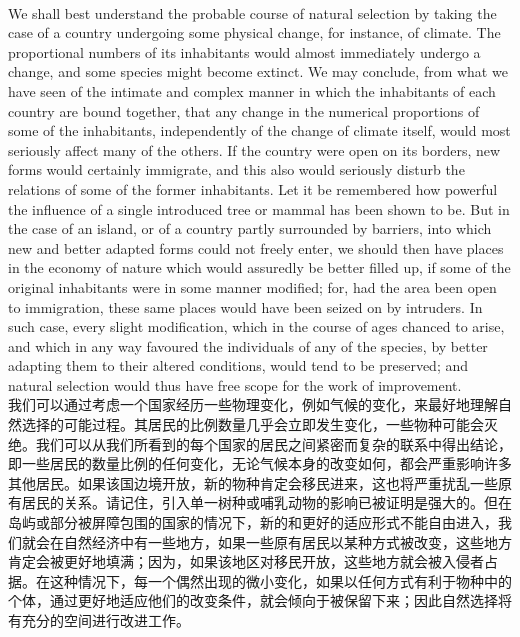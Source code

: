 \documentclass{article}
\begin{document}
\\
We shall best understand the probable course of natural selection by taking the case of a country undergoing some physical change, for instance, of climate. The proportional numbers of its inhabitants would almost immediately undergo a change, and some species might become extinct. We may conclude, from what we have seen of the intimate and complex manner in which the inhabitants of each country are bound together, that any change in the numerical proportions of some of the inhabitants, independently of the change of climate itself, would most seriously affect many of the others. If the country were open on its borders, new forms would certainly immigrate, and this also would seriously disturb the relations of some of the former inhabitants. Let it be remembered how powerful the influence of a single introduced tree or mammal has been shown to be. But in the case of an island, or of a country partly surrounded by barriers, into which new and better adapted forms could not freely enter, we should then have places in the economy of nature which would assuredly be better filled up, if some of the original inhabitants were in some manner modified; for, had the area been open to immigration, these same places would have been seized on by intruders. In such case, every slight modification, which in the course of ages chanced to arise, and which in any way favoured the individuals of any of the species, by better adapting them to their altered conditions, would tend to be preserved; and natural selection would thus have free scope for the work of improvement.\\
我们可以通过考虑一个国家经历一些物理变化，例如气候的变化，来最好地理解自然选择的可能过程。其居民的比例数量几乎会立即发生变化，一些物种可能会灭绝。我们可以从我们所看到的每个国家的居民之间紧密而复杂的联系中得出结论，即一些居民的数量比例的任何变化，无论气候本身的改变如何，都会严重影响许多其他居民。如果该国边境开放，新的物种肯定会移民进来，这也将严重扰乱一些原有居民的关系。请记住，引入单一树种或哺乳动物的影响已被证明是强大的。但在岛屿或部分被屏障包围的国家的情况下，新的和更好的适应形式不能自由进入，我们就会在自然经济中有一些地方，如果一些原有居民以某种方式被改变，这些地方肯定会被更好地填满；因为，如果该地区对移民开放，这些地方就会被入侵者占据。在这种情况下，每一个偶然出现的微小变化，如果以任何方式有利于物种中的个体，通过更好地适应他们的改变条件，就会倾向于被保留下来；因此自然选择将有充分的空间进行改进工作。
\end{document}
